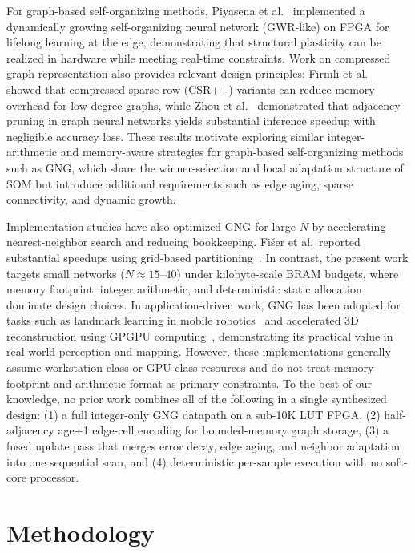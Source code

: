 \documentclass[conference]{IEEEtran}
\begin{document}
For graph-based self-organizing methods, Piyasena et al.~\cite{piyasena2020fpl} implemented a dynamically growing self-organizing neural network (GWR-like) on FPGA for lifelong learning at the edge, demonstrating that structural plasticity can be realized in hardware while meeting real-time constraints. Work on compressed graph representation also provides relevant design principles: Firmli et al.~\cite{firmli2021csrpp} showed that compressed sparse row (CSR++) variants can reduce memory overhead for low-degree graphs, while Zhou et al.~\cite{Zhou2021GNNPruning} demonstrated that adjacency pruning in graph neural networks yields substantial inference speedup with negligible accuracy loss. These results motivate exploring similar integer-arithmetic and memory-aware strategies for graph-based self-organizing methods such as GNG, which share the winner-selection and local adaptation structure of SOM but introduce additional requirements such as edge aging, sparse connectivity, and dynamic growth.

Implementation studies have also optimized GNG for large $N$ by accelerating nearest-neighbor search and reducing bookkeeping. Fi\v{s}er et al.\ reported substantial speedups using grid-based partitioning~\cite{Fiser2013Efficient}. In contrast, the present work targets small networks ($N\approx 15$--$40$) under kilobyte-scale BRAM budgets, where memory footprint, integer arithmetic, and deterministic static allocation dominate design choices. In application-driven work, GNG has been adopted for tasks such as landmark learning in mobile robotics~\cite{Hernandez2005Landmarks} and accelerated 3D reconstruction using GPGPU computing~\cite{orts2012gpgpu}, demonstrating its practical value in real-world perception and mapping. However, these implementations generally assume workstation-class or GPU-class resources and do not treat memory footprint and arithmetic format as primary constraints. To the best of our knowledge, no prior work combines all of the following in a single synthesized design: (1) a full integer-only GNG datapath on a sub-10K LUT FPGA, (2) half-adjacency age+1 edge-cell encoding for bounded-memory graph storage, (3) a fused update pass that merges error decay, edge aging, and neighbor adaptation into one sequential scan, and (4) deterministic per-sample execution with no soft-core processor.


\section{Methodology}
\end{document}
